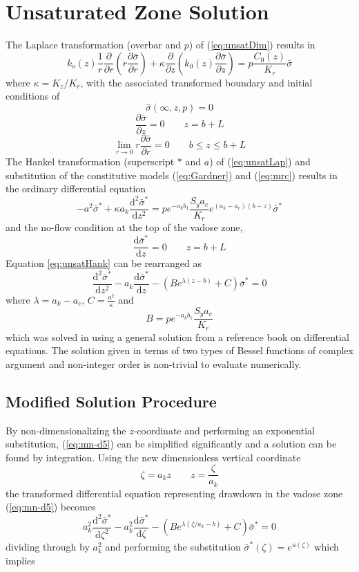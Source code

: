 \documentclass[11pt]{article}
\begin{document}
\section{Unsaturated Zone Solution}
The Laplace transformation (overbar and $p$) of (\ref{eq:unsatDim}) results in
\begin{equation}
  \label{eq:unsatLap}
   k_o(z) \frac{1}{r} \frac{\partial}{\partial r} \left( r\frac{\partial \bar{\sigma}}{\partial r} \right) +\kappa \frac{\partial}{\partial z} \left( k_0(z) \frac{\partial \bar{\sigma}}{\partial z}\right) = p \frac{C_0(z)}{K_r}  \bar{\sigma}
\end{equation}
where $\kappa=K_z/K_r$, with the associated transformed boundary and initial conditions of
$$ \bar{\sigma}(\infty,z,p) = 0$$
$$ \frac{\partial \bar{\sigma}}{\partial z}=0 \qquad z=b+L$$
 $$\lim_{r \rightarrow 0} r \frac{\partial \bar{\sigma}}{\partial r} = 0 \qquad b\le z \le b+L$$
The Hankel transformation (superscript $\ast$ and $a$) of (\ref{eq:unsatLap}) and substitution of the constitutive models (\ref{eq:Gardner}) and (\ref{eq:mrc}) results in the ordinary differential equation
\begin{equation}
  \label{eq:unsatHank}
   -a^2 \bar{\sigma}^{\ast} + \kappa a_k \frac{\mathrm{d}^2 \bar{\sigma}^{\ast}}{\mathrm{d} z^2}  = p e^{-a_k b_1} \frac{S_y a_c} {K_r}  e^{\left(a_k -a_c \right)\left( b - z\right)} \bar{\sigma}^{\ast} 
\end{equation}
and the no-flow condition at the top of the vadose zone, 
$$ \frac{\mathrm{d}\bar{\sigma}^{\ast}}{\mathrm{d}z}=0 \qquad z=b+L $$
Equation \ref{eq:unsatHank} can be rearranged as
\begin{equation}
  \label{eq:mn-d5}
  \frac{\mathrm{d}^2 \bar{\sigma}^{\ast}}{\mathrm{d}z^2} - a_k \frac{\mathrm{d} \bar{\sigma}^{\ast}}{\mathrm{d}z} - \left( B e^{\lambda (z-b)} + C\right) \bar{\sigma}^{\ast}=0
\end{equation}
where $\lambda = a_k-a_c$, $C=\frac{a^2}{\kappa}$ and
$$B = p e^{-a_k b_1} \frac{S_y a_c} {K_r} $$
which was solved in \cite{mishra10} using a general solution from a reference book on differential equations.  The solution given in terms of two types of Bessel functions of complex argument and non-integer order is non-trivial to evaluate numerically. 
\subsection{Modified Solution Procedure} 
By non-dimensionalizing the $z$-coordinate and performing an exponential substitution, (\ref{eq:mn-d5}) can be simplified significantly and a solution can be found by integration.  Using the new dimensionless vertical coordinate 
$$ \zeta=a_k z \qquad z=\frac{\zeta}{a_k} $$
the transformed differential equation representing drawdown in the vadose zone (\ref{eq:mn-d5}) becomes
\begin{equation}
  \label{eq:nondimODE}
  a_k^2 \frac{\mathrm{d}^2 \bar{\sigma}^{\ast}}{\mathrm{d}\zeta^2} - a_k^2 \frac{\mathrm{d} \bar{\sigma}^{\ast}}{\mathrm{d}\zeta} - \left( B e^{\lambda (\zeta/a_k-b)} + C\right) \bar{\sigma}^{\ast}=0
\end{equation}
dividing through by $a_k^2$ and performing the substitution
$\bar{\sigma}^{\ast}(\zeta)=e^{u(\zeta)}$ which implies
\end{document}
